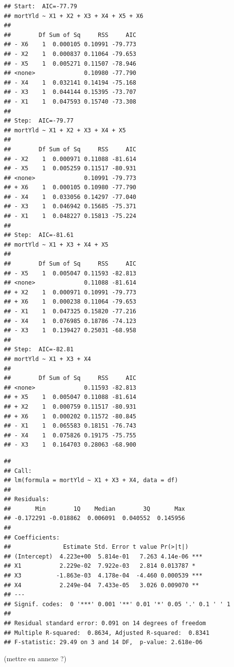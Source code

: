 \documentclass[
  11pt,
]{article}
\begin{document}
\begin{verbatim}
## Start:  AIC=-77.79
## mortYld ~ X1 + X2 + X3 + X4 + X5 + X6
## 
##        Df Sum of Sq     RSS     AIC
## - X6    1  0.000105 0.10991 -79.773
## - X2    1  0.000837 0.11064 -79.653
## - X5    1  0.005271 0.11507 -78.946
## <none>              0.10980 -77.790
## - X4    1  0.032141 0.14194 -75.168
## - X3    1  0.044144 0.15395 -73.707
## - X1    1  0.047593 0.15740 -73.308
## 
## Step:  AIC=-79.77
## mortYld ~ X1 + X2 + X3 + X4 + X5
## 
##        Df Sum of Sq     RSS     AIC
## - X2    1  0.000971 0.11088 -81.614
## - X5    1  0.005259 0.11517 -80.931
## <none>              0.10991 -79.773
## + X6    1  0.000105 0.10980 -77.790
## - X4    1  0.033056 0.14297 -77.040
## - X3    1  0.046942 0.15685 -75.371
## - X1    1  0.048227 0.15813 -75.224
## 
## Step:  AIC=-81.61
## mortYld ~ X1 + X3 + X4 + X5
## 
##        Df Sum of Sq     RSS     AIC
## - X5    1  0.005047 0.11593 -82.813
## <none>              0.11088 -81.614
## + X2    1  0.000971 0.10991 -79.773
## + X6    1  0.000238 0.11064 -79.653
## - X1    1  0.047325 0.15820 -77.216
## - X4    1  0.076985 0.18786 -74.123
## - X3    1  0.139427 0.25031 -68.958
## 
## Step:  AIC=-82.81
## mortYld ~ X1 + X3 + X4
## 
##        Df Sum of Sq     RSS     AIC
## <none>              0.11593 -82.813
## + X5    1  0.005047 0.11088 -81.614
## + X2    1  0.000759 0.11517 -80.931
## + X6    1  0.000202 0.11572 -80.845
## - X1    1  0.065583 0.18151 -76.743
## - X4    1  0.075826 0.19175 -75.755
## - X3    1  0.164703 0.28063 -68.900
\end{verbatim}

\begin{verbatim}
## 
## Call:
## lm(formula = mortYld ~ X1 + X3 + X4, data = df)
## 
## Residuals:
##       Min        1Q    Median        3Q       Max 
## -0.172291 -0.018862  0.006091  0.040552  0.145956 
## 
## Coefficients:
##               Estimate Std. Error t value Pr(>|t|)    
## (Intercept)  4.223e+00  5.814e-01   7.263 4.14e-06 ***
## X1           2.229e-02  7.922e-03   2.814 0.013787 *  
## X3          -1.863e-03  4.178e-04  -4.460 0.000539 ***
## X4           2.249e-04  7.433e-05   3.026 0.009070 ** 
## ---
## Signif. codes:  0 '***' 0.001 '**' 0.01 '*' 0.05 '.' 0.1 ' ' 1
## 
## Residual standard error: 0.091 on 14 degrees of freedom
## Multiple R-squared:  0.8634, Adjusted R-squared:  0.8341 
## F-statistic: 29.49 on 3 and 14 DF,  p-value: 2.618e-06
\end{verbatim}

(mettre en annexe ?)
\end{document}
